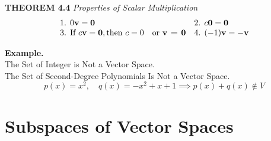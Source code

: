 \documentclass{article}
\newcommand\B{\textbf}
\newcommand\tcl{\begin{tcolorbox}[colback = {blue9}]}
\newcommand\etcl{\end{tcolorbox}}
\begin{document}
    \tcl
    \B{THEOREM 4.4 } \quad \textit{Properties of Scalar Multiplication}
    \[\begin{array}{ll}
        \text{1. } 0\B{v} = \B{0} & \text{2. } c\B{0} = \B{0} \\
        \text{3. If }c\B{v} = \B{0}, \text{then } c = 0 \quad   \text{or \B{v = 0}} & \text{4. } (-1)\B{v} = -\textbf{v}
    \end{array}\]
    \etcl

    \B{Example. } \\
    The Set of Integer is Not a Vector Space.\\
    The Set of Second-Degree Polynomials Is Not a Vector Space.
    \[ p(x) = x^2, \quad q(x) = -x^2 + x + 1 \implies p(x) + q(x) \notin V \]

    \section{Subspaces of Vector Spaces}
\end{document}
